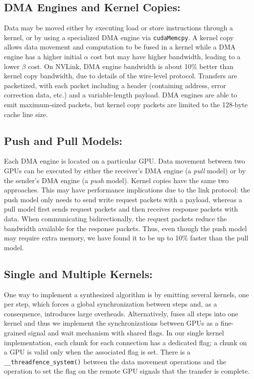 \subsection{DMA Engines and Kernel Copies:} Data may be moved either by
executing load or store instructions through a kernel, or by using a
specialized DMA engine via \texttt{cudaMemcpy}. A kernel copy allows
data movement and computation to be fused in a kernel while a DMA
engine has a higher initial $\alpha$ cost but may have higher
bandwidth, leading to a lower $\beta$ cost. On NVLink, DMA engine
bandwidth is about 10\% better than kernel copy bandwidth, due to
details of the wire-level protocol. Transfers are packetized, with
each packet including a header (containing address, error correction
data, etc.) and a variable-length payload. DMA engines are able to
emit maximum-sized packets, but kernel copy packets are limited to the
128-byte cache line size.

\subsection{Push and Pull Models:} Each DMA engine is located on a
particular GPU. Data movement between two GPUs can be executed by
either the receiver's DMA engine (a {\em pull} model) or by the
sender's DMA engine (a {\em push} model). Kernel copies have the same
two approaches. This may have performance implications due to the link
protocol: the push model only needs to send write request packets with
a payload, whereas a pull model first sends request packets and then
receives response packets with data. When communicating
bidirectionally, the request packets reduce the bandwidth available
for the response packets. Thus, even though the push model may require
extra memory, we have found it to be up to 10\% faster than the pull
model.



\subsection{Single and Multiple Kernels:} One way to implement a
synthesized algorithm is by emitting several kernels, one per step,
which forces a global synchronization between steps and, as a
consequence, introduces large overheads. Alternatively, \tool{} fuses
all steps into one kernel and thus we implement the synchronizations
between GPUs as a fine-grained signal and wait mechanism with shared
flags. In our single kernel implementation, each chunk for each
connection has a dedicated flag; a chunk on a GPU is valid only when
the associated flag is set. There is a
\texttt{\_\_threadfence\_system()} between the data movement
operations and the operation to set the flag on the remote GPU signals
that the transfer is complete.

